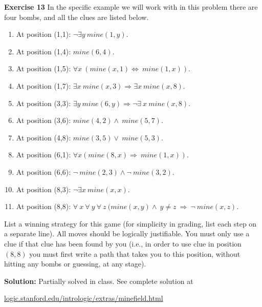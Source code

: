 \documentclass[12pt,oneside]{exam}
\newenvironment{exercise}[1]{\vspace{.1in}\noindent\textbf{Exercise #1 \hspace{.05em}}}{}
\newenvironment{newsolution}{\vspace{.1in}\noindent\textbf{Solution: \hspace{.05em}}}{}
\begin{document}
\begin{exercise}{13}
In the specific example we will work with in this problem there are four bombs, and all the clues are listed below. 
\begin{enumerate}
\item At position (1,1): $\neg \exists y \ mine(1,y)$.
\item At position (1,4): $mine(6,4)$. 
\item At position (1,5): $\forall x \ (mine(x,1) \Leftrightarrow \ mine(1,x))$. 
\item At position (1,7): $\exists x \ mine(x,3) \Rightarrow \exists x \ mine(x,8)$.
\item At position (3,3): $\exists y \ mine(6,y) \Rightarrow \neg \exists \ x \ mine(x,8)$.
\item At position (3,6): $mine(4,2)\land \ mine(5,7)$.
\item At position (4,8): $mine(3,5) \lor \ mine(5,3)$. 
\item At position (6,1): $\forall x (mine(8,x) \Rightarrow \ mine(1,x))$.
\item At position (6,6): $\neg \ mine(2,3) \land \neg \ mine(3,2)$.
\item At position (8,3): $\neg \exists x \ mine(x,x)$.
\item At position (8,8): $\forall \ x \ \forall \ y \ \forall \ z \ (mine(x,y) \land \ y \neq z \ \Rightarrow \ \neg \ mine(x,z)$. 
\end{enumerate}

List a winning strategy for this game (for simplicity in grading, list each step on a separate line). All moves should be logically justifiable. You must only use a clue if that clue has been found by you (i.e., in order to use clue in position $(8,8)$ you must first write a path that takes you to this position, without hitting any bombs or guessing, at any stage).
\end{exercise}

\begin{newsolution}
Partially solved in class. See complete solution at
\begin{center}
\url{logic.stanford.edu/intrologic/extras/minefield.html}
\end{center}
\end{newsolution}
\end{document}
